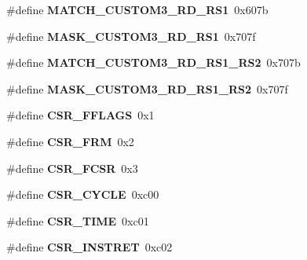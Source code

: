 \begin{DoxyCompactItemize}
\item 
\mbox{\label{riscv-utility_8h_a8fc019059f136b52b7790ba9fd740968}} 
\#define {\bfseries M\+A\+T\+C\+H\+\_\+\+C\+U\+S\+T\+O\+M3\+\_\+\+R\+D\+\_\+\+R\+S1}~0x607b
\item 
\mbox{\label{riscv-utility_8h_a1ddd1c9e817aa860785b4b01cb37104e}} 
\#define {\bfseries M\+A\+S\+K\+\_\+\+C\+U\+S\+T\+O\+M3\+\_\+\+R\+D\+\_\+\+R\+S1}~0x707f
\item 
\mbox{\label{riscv-utility_8h_a3ede21adc6ac0a5da748903557ad7251}} 
\#define {\bfseries M\+A\+T\+C\+H\+\_\+\+C\+U\+S\+T\+O\+M3\+\_\+\+R\+D\+\_\+\+R\+S1\+\_\+\+R\+S2}~0x707b
\item 
\mbox{\label{riscv-utility_8h_a6018437e2c48ae75537a49453e27a008}} 
\#define {\bfseries M\+A\+S\+K\+\_\+\+C\+U\+S\+T\+O\+M3\+\_\+\+R\+D\+\_\+\+R\+S1\+\_\+\+R\+S2}~0x707f
\item 
\mbox{\label{riscv-utility_8h_af25caf1486cedbc47afdd5afd81be307}} 
\#define {\bfseries C\+S\+R\+\_\+\+F\+F\+L\+A\+GS}~0x1
\item 
\mbox{\label{riscv-utility_8h_aab22a5666b6fd37cde09583f0ca66133}} 
\#define {\bfseries C\+S\+R\+\_\+\+F\+RM}~0x2
\item 
\mbox{\label{riscv-utility_8h_abba4da62b155cd22e3bd1a8ec402cf78}} 
\#define {\bfseries C\+S\+R\+\_\+\+F\+C\+SR}~0x3
\item 
\mbox{\label{riscv-utility_8h_a9e9434c8a5b1f157f1a7b800c26321bb}} 
\#define {\bfseries C\+S\+R\+\_\+\+C\+Y\+C\+LE}~0xc00
\item 
\mbox{\label{riscv-utility_8h_a4bbdf33e8b20f4cb020869e7394e388a}} 
\#define {\bfseries C\+S\+R\+\_\+\+T\+I\+ME}~0xc01
\item 
\mbox{\label{riscv-utility_8h_a053f87dc2e911eb74a904232a0db20f5}} 
\#define {\bfseries C\+S\+R\+\_\+\+I\+N\+S\+T\+R\+ET}~0xc02
\item 
\mbox{\label{riscv-utility_8h_abc9ec186541e531bfb831892b656c48c}} 

\end{DoxyCompactItemize}
